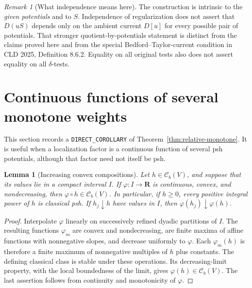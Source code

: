 \documentclass[11pt,a4paper]{article}
\numberwithin{equation}{section}
\newtheorem{lemma}[theorem]{Lemma}
\theoremstyle{definition}
\theoremstyle{remark}
\newtheorem{remark}[theorem]{Remark}
\newcommand{\Cb}{\mathcal C_b}
\begin{document}
\begin{remark}[What independence means here]
The construction is intrinsic to the \emph{given potentials} and to $S$.
Independence of regularization does not assert that $D(uS)$ depends only
on the ambient current $D[u]$ for every possible pair of potentials.
That stronger quotient-by-potentials statement is distinct from the
claims proved here and from the special Bedford--Taylor-current
condition in CLD 2025, Definition 8.6.2. Equality on all original tests
also does not assert equality on all $\delta$-tests.
\end{remark}



\section{Continuous functions of several monotone weights}
\label{sec:functional-weights}

This section records a \texttt{DIRECT\_COROLLARY} of
Theorem~\ref{thm:relative-monotone}. It is useful when a localization
factor is a continuous function of several psh potentials, although that
factor need not itself be psh.

\begin{lemma}[Increasing convex compositions]
\label{lem:convex-compositions}
Let $h\in\Cb(V)$, and suppose that its values lie in a compact interval
$I$. If $\varphi:I\to\mathbf R$ is continuous, convex, and
nondecreasing, then $\varphi\circ h\in\Cb(V)$. In particular, if
$h\geq0$, every positive integral power of $h$ is classical psh.
If $h_j\downarrow h$ have values in $I$, then
$\varphi(h_j)\downarrow\varphi(h)$.
\end{lemma}

\begin{proof}
Interpolate $\varphi$ linearly on successively refined dyadic partitions
of $I$. The resulting functions $\varphi_m$ are convex and
nondecreasing, are finite maxima of affine functions with nonnegative
slopes, and decrease uniformly to $\varphi$. Each
$\varphi_m(h)$ is therefore a finite maximum of nonnegative multiples
of $h$ plus constants. The defining classical class is stable under
these operations. Its decreasing-limit property, with the local
boundedness of the limit, gives $\varphi(h)\in\Cb(V)$.
The last assertion follows from continuity and monotonicity of
$\varphi$.
\end{proof}
\end{document}
